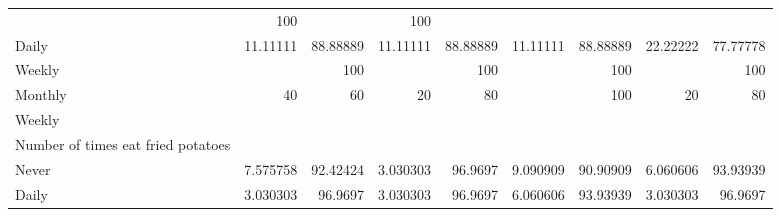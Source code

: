 \documentclass{article}
\begin{document}
\begin{tabular}{lllllllll}
  \multicolumn{1}{r}{} &
  \multicolumn{1}{r}{100} &
  \multicolumn{1}{r}{} &
  \multicolumn{1}{r}{100} \\
\multicolumn{1}{l}{\hspace{7em}Daily} &
  \multicolumn{1}{|r}{11.11111} &
  \multicolumn{1}{r}{88.88889} &
  \multicolumn{1}{r}{11.11111} &
  \multicolumn{1}{r}{88.88889} &
  \multicolumn{1}{r}{11.11111} &
  \multicolumn{1}{r}{88.88889} &
  \multicolumn{1}{r}{22.22222} &
  \multicolumn{1}{r}{77.77778} \\
\multicolumn{1}{l}{\hspace{7em}Weekly} &
  \multicolumn{1}{|r}{} &
  \multicolumn{1}{r}{100} &
  \multicolumn{1}{r}{} &
  \multicolumn{1}{r}{100} &
  \multicolumn{1}{r}{} &
  \multicolumn{1}{r}{100} &
  \multicolumn{1}{r}{} &
  \multicolumn{1}{r}{100} \\
\multicolumn{1}{l}{\hspace{7em}Monthly} &
  \multicolumn{1}{|r}{40} &
  \multicolumn{1}{r}{60} &
  \multicolumn{1}{r}{20} &
  \multicolumn{1}{r}{80} &
  \multicolumn{1}{r}{} &
  \multicolumn{1}{r}{100} &
  \multicolumn{1}{r}{20} &
  \multicolumn{1}{r}{80} \\
\multicolumn{1}{l}{\hspace{5em}Weekly} &
  \multicolumn{1}{|r}{} &
  \multicolumn{1}{r}{} &
  \multicolumn{1}{r}{} &
  \multicolumn{1}{r}{} &
  \multicolumn{1}{r}{} &
  \multicolumn{1}{r}{} &
  \multicolumn{1}{r}{} &
  \multicolumn{1}{r}{} \\
\multicolumn{1}{l}{\hspace{6em}Number of times eat fried potatoes} &
  \multicolumn{1}{|r}{} &
  \multicolumn{1}{r}{} &
  \multicolumn{1}{r}{} &
  \multicolumn{1}{r}{} &
  \multicolumn{1}{r}{} &
  \multicolumn{1}{r}{} &
  \multicolumn{1}{r}{} &
  \multicolumn{1}{r}{} \\
\multicolumn{1}{l}{\hspace{7em}Never} &
  \multicolumn{1}{|r}{7.575758} &
  \multicolumn{1}{r}{92.42424} &
  \multicolumn{1}{r}{3.030303} &
  \multicolumn{1}{r}{96.9697} &
  \multicolumn{1}{r}{9.090909} &
  \multicolumn{1}{r}{90.90909} &
  \multicolumn{1}{r}{6.060606} &
  \multicolumn{1}{r}{93.93939} \\
\multicolumn{1}{l}{\hspace{7em}Daily} &
  \multicolumn{1}{|r}{3.030303} &
  \multicolumn{1}{r}{96.9697} &
  \multicolumn{1}{r}{3.030303} &
  \multicolumn{1}{r}{96.9697} &
  \multicolumn{1}{r}{6.060606} &
  \multicolumn{1}{r}{93.93939} &
  \multicolumn{1}{r}{3.030303} &
  \multicolumn{1}{r}{96.9697} \\

\end{tabular}
\end{document}
